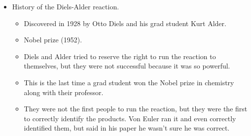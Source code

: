\documentclass[../notes.tex]{subfiles}
\begin{document}
\begin{itemize}
\begin{itemize}
\begin{figure}[h!]
\begin{subfigure}[b]{0.4\linewidth}
                \caption{Bromination of alkanes.}
                \label{fig:rxnDiagramAlkaneHalogenationb}
            \end{subfigure}
            \caption{Reaction diagrams for the RDS of halogenation of alkanes.}
            \label{fig:rxnDiagramAlkaneHalogenation}
        \end{figure}
        \begin{itemize}
            \item Forming  \emph{releases} $\SI[per-mode=symbol]{103}{\kilo\calorie\per\mole}$, and thus is exothermic.
            \item Forming  \emph{requires} $\SI[per-mode=symbol]{87}{\kilo\calorie\per\mole}$, and thus is endothermic.
            \item By \textbf{Hammond's postulate}, the transition state in bromination of alkanes (Figure \ref{fig:rxnDiagramAlkaneHalogenationb}) more closely resembles the products, while the transition state in chlorination of alkanes (Figure \ref{fig:rxnDiagramAlkaneHalogenationa}) more closely resembles the reactants.
            \item Thus, the transition states in the two bromination reactions, already more energetically separated than their chlorination cousins, are more sensitive to which type of radical is formed than the transition states in the two chlorination reactions.
        \end{itemize}
    \end{itemize}
    \item History of the Diels-Alder reaction.
    \begin{itemize}
        \item Discovered in 1928 by Otto Diels and his grad student Kurt Alder.
        \item Nobel prize (1952).
        \item Diels and Alder tried to reserve the right to run the reaction to themselves, but they were not successful because it was so powerful.
        \item This is the last time a grad student won the Nobel prize in chemistry along with their professor.
        \item They were not the first people to run the reaction, but they were the first to correctly identify the products. Von Euler ran it and even correctly identified them, but said in his paper he wasn't sure he was correct.

\end{itemize}
\end{itemize}
\end{document}
